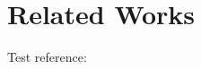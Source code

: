 \section{Related Works}
\label{Sec:RelatedWorks}

Test reference:\cite{Liu:MSST:2012}
\cite{SlurmBBGuide}
\cite{Romanus:CORR:15}


